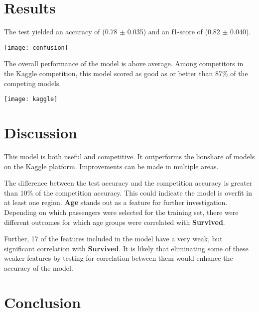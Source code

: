 \documentclass[10pt]{article}
\begin{document}
\begin{multicols}{2}
\section{Results}

	The test yielded an accuracy of (0.78 $\pm$ 0.035) and an f1-score of (0.82 $\pm$ 0.040).
	\begin{center}
		\texttt{[image: confusion]}
	\end{center}
	The overall performance of the model is above average.
	Among competitors in the Kaggle competition, this model scored as good as or better than 87\% of the competing models.
	\begin{center}
		\texttt{[image: kaggle]}
	\end{center}

\section{Discussion}

	This model is both useful and competitive.
	It outperforms the lionshare of models on the Kaggle platform.
	Improvements can be made in multiple areas.
	
	The difference  between the test accuracy and the competition accuracy is greater than 10\% of the competition accuracy.
	This could indicate the model is overfit in at least one region.
	\textbf{Age} stands out as a feature for further investigation.
	Depending on which passengers were selected for the training set, there were different outcomes for which age groups were correlated with \textbf{Survived}.

	Further, 17 of the features included in the model have a very weak, but significant correlation with \textbf{Survived}.
	It is likely that eliminating some of these weaker features by testing for correlation between them would enhance the accuracy of the model.
\section{Conclusion}\label{conclusions}

\end{multicols}
\end{document}
